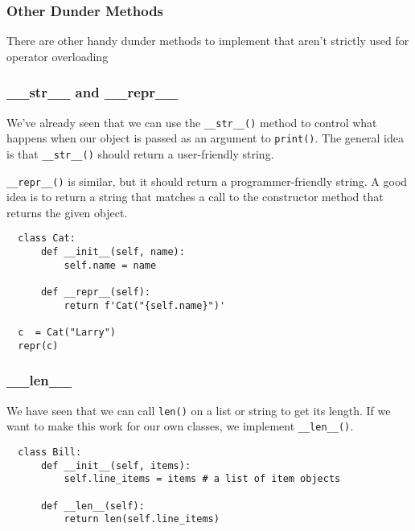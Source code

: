 \documentclass[10pt]{beamer}
\begin{document}
\begin{frame}
  \frametitle{Other Dunder Methods}
  
  There are other handy dunder methods to implement that aren't strictly 
  used for operator overloading 
  
\end{frame}

\begin{frame}[fragile]
  \frametitle{\_\_str\_\_  and \_\_repr\_\_}
  
  We've already seen that we can use the \texttt{\_\_str\_\_()}
  method to control what happens when our object is passed as an argument to 
  \texttt{print()}. The general idea is that \texttt{\_\_str\_\_()} should return 
  a user-friendly string.
  
  \vspace{5mm}
  \texttt{\_\_repr\_\_()} is similar, but it should return a programmer-friendly string. A
  good idea is to return a string that matches a call to the constructor method that returns
  the given object.
  
  \begin{verbatim}
  class Cat:
      def __init__(self, name):
          self.name = name
          
      def __repr__(self):
          return f'Cat("{self.name}")'
          
  c  = Cat("Larry")
  repr(c)                 
  \end{verbatim}           
  
\end{frame}

\begin{frame}[fragile]
  \frametitle{\_\_len\_\_}
  
  We have seen that we can call \texttt{len()} on a list or
  string to get its length. If we want to make this work for our own classes,
  we implement \texttt{\_\_len\_\_()}.

  \begin{verbatim}
  class Bill:
      def __init__(self, items):
          self.line_items = items # a list of item objects
          
      def __len__(self):
          return len(self.line_items)
  \end{verbatim}        

\end{frame}
\end{document}

